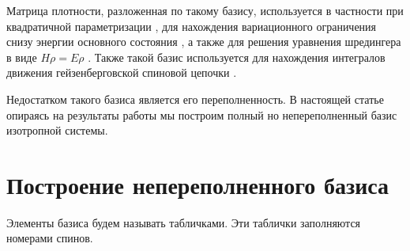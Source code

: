 \documentclass[]{article}
\renewcommand{\[}{\begin{equation}}
\renewcommand{\]}{\end{equation}}
\begin{document}
Матрица плотности, разложенная по такому базису, используется в частности при квадратичной параметризации \cite{kvadro},
для нахождения вариационного ограничения снизу энергии основного состояния \cite{variational}, 
а также для решения уравнения шредингера в виде $ H\rho = E\rho $ \cite{USH}.
Также такой базис используется для нахождения интегралов движения гейзенберговской спиновой цепочки \cite{basisF}.

Недостатком такого базиса является его переполненность.
В настоящей статье опираясь на результаты работы \cite{sourceArticle}
мы построим полный но непереполненный базис изотропной системы.




\section{Построение непереполненного базиса \cite{sourceArticle}}
Элементы базиса будем называть табличками. Эти таблички заполняются номерами спинов.
\end{document}
